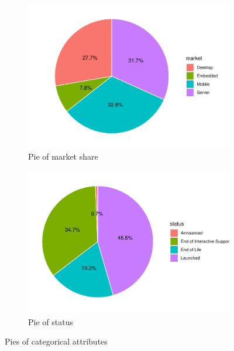 \begin{figure}[H]
    \centering
    \begin{subfigure}[b]{0.49\textwidth}
        \centering
        \includegraphics[width=\textwidth]{./graphics/pie_market.pdf}
        \caption{Pie of market share}
    \end{subfigure}
    \hfill
    \begin{subfigure}[b]{0.49\textwidth}
        \centering
        \includegraphics[width=\textwidth]{./graphics/pie_status.pdf}
        \caption{Pie of status}
    \end{subfigure}
    \caption{Pies of categorical attributes}
    \label{fig:pie_category}
\end{figure}



